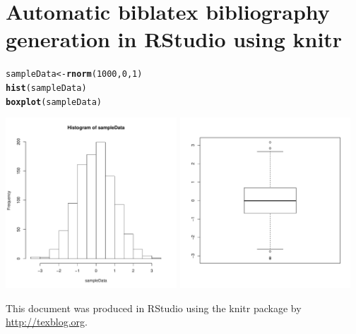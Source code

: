 \documentclass{article}\usepackage[]{graphicx}\usepackage[]{color}
\makeatletter
\newcommand{\hlnum}[1]{\textcolor[rgb]{0.686,0.059,0.569}{#1}}%
\newcommand{\hlstd}[1]{\textcolor[rgb]{0.345,0.345,0.345}{#1}}%
\newcommand{\hlkwb}[1]{\textcolor[rgb]{0.69,0.353,0.396}{#1}}%
\newcommand{\hlkwd}[1]{\textcolor[rgb]{0.737,0.353,0.396}{\textbf{#1}}}%
\newenvironment{kframe}{%
 \def\at@end@of@kframe{}%
 \ifinner\ifhmode%
  \def\at@end@of@kframe{\end{minipage}}%
  \begin{minipage}{\columnwidth}%
 \fi\fi%
 \def\FrameCommand##1{\hskip\@totalleftmargin \hskip-\fboxsep
 \colorbox{shadecolor}{##1}\hskip-\fboxsep
     \hskip-\linewidth \hskip-\@totalleftmargin \hskip\columnwidth}%
 \MakeFramed {\advance\hsize-\width
   \@totalleftmargin\z@ \linewidth\hsize
   \@setminipage}}%
 {\par\unskip\endMakeFramed%
 \at@end@of@kframe}
\newenvironment{knitrout}{}{} %
\makeatother
\begin{document}
 
\section*{Automatic biblatex bibliography generation in RStudio using knitr}
 

 
\begin{knitrout}
\color{fgcolor}\begin{kframe}
\begin{alltt}
\hlstd{sampleData} \hlkwb{<-} \hlkwd{rnorm}\hlstd{(}\hlnum{1000}\hlstd{,} \hlnum{0}\hlstd{,}\hlnum{1}\hlstd{)}
\hlkwd{hist}\hlstd{(sampleData)}
\hlkwd{boxplot}\hlstd{(sampleData)}
\end{alltt}
\end{kframe}

{\centering \includegraphics[width=0.48\textwidth]{figures/plots-sample-data-hist-and-box-1} 
\includegraphics[width=0.48\textwidth]{figures/plots-sample-data-hist-and-box-2} 

}



\end{knitrout}
 
This document was produced in RStudio using the knitr package \cite{knitr2013} by \url{http://texblog.org}.
 
\printbibliography
 
\end{document}
